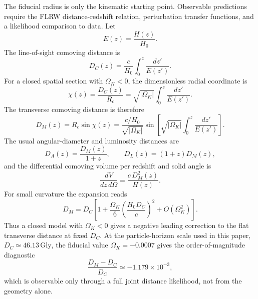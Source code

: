 \documentclass[aps,prd,onecolumn,superscriptaddress,longbibliography,nofootinbib,notitlepage]{revtex4-2}
\begin{document}
The fiducial radius is only the kinematic starting point. Observable predictions
require the FLRW distance-redshift relation, perturbation transfer functions, and
a likelihood comparison to data. Let
\begin{equation}
  E(z)=\frac{H(z)}{H_0}.
\end{equation}
The line-of-sight comoving distance is
\begin{equation}
  D_C(z)=\frac{c}{H_0}\int_0^z\frac{dz'}{E(z')}.
\end{equation}
For a closed spatial section with $\Omega_K<0$, the dimensionless radial coordinate
is
\begin{equation}
  \chi(z)=\frac{D_C(z)}{R_c}
  =\sqrt{|\Omega_K|}\int_0^z\frac{dz'}{E(z')}.
\end{equation}
The transverse comoving distance is therefore
\begin{equation}
\boxed{
  D_M(z)=R_c\sin\chi(z)
  =\frac{c/H_0}{\sqrt{|\Omega_K|}}
  \sin\!\left[
    \sqrt{|\Omega_K|}\int_0^z\frac{dz'}{E(z')}
  \right].}
\end{equation}
The usual angular-diameter and luminosity distances are
\begin{equation}
  D_A(z)=\frac{D_M(z)}{1+z},
  \qquad
  D_L(z)=(1+z)D_M(z),
\end{equation}
and the differential comoving volume per redshift and solid angle is
\begin{equation}
  \frac{dV}{dz\,d\Omega}=\frac{c\,D_M^2(z)}{H(z)}.
\end{equation}
For small curvature the expansion reads
\begin{equation}
  D_M=D_C\left[
  1+\frac{\Omega_K}{6}\left(\frac{H_0D_C}{c}\right)^2
  +O(\Omega_K^2)\right].
\end{equation}
Thus a closed model with $\Omega_K<0$ gives a negative leading correction to the
flat transverse distance at fixed $D_C$. At the particle-horizon scale used in this
paper, $D_C\simeq46.13\,\mathrm{Gly}$, the fiducial value
$\Omega_K=-0.0007$ gives the order-of-magnitude diagnostic
\begin{equation}
  \frac{D_M-D_C}{D_C}
  \simeq -1.179\times10^{-3},
\end{equation}
which is observable only through a full joint distance likelihood, not from the
geometry alone.
\end{document}
